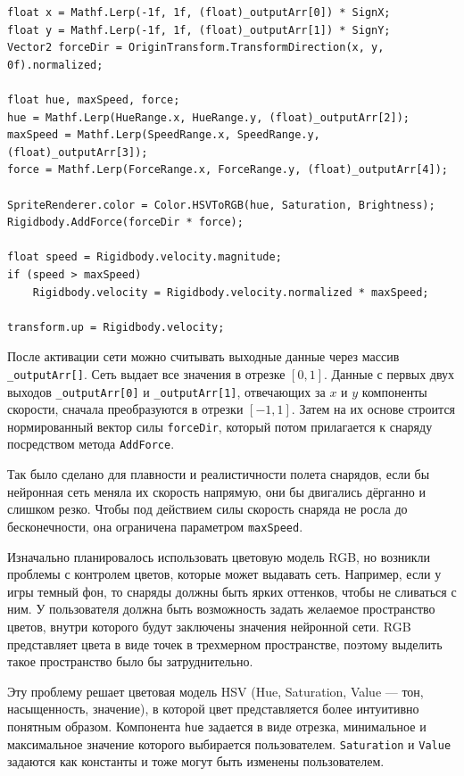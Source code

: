 \pagebreak

\begin{lstlisting}[name=Projectile, caption={Projectile. Part 2}]
float x = Mathf.Lerp(-1f, 1f, (float)_outputArr[0]) * SignX;
float y = Mathf.Lerp(-1f, 1f, (float)_outputArr[1]) * SignY;    
Vector2 forceDir = OriginTransform.TransformDirection(x, y, 0f).normalized;
    
float hue, maxSpeed, force;
hue = Mathf.Lerp(HueRange.x, HueRange.y, (float)_outputArr[2]);
maxSpeed = Mathf.Lerp(SpeedRange.x, SpeedRange.y, (float)_outputArr[3]);
force = Mathf.Lerp(ForceRange.x, ForceRange.y, (float)_outputArr[4]);

SpriteRenderer.color = Color.HSVToRGB(hue, Saturation, Brightness);
Rigidbody.AddForce(forceDir * force);

float speed = Rigidbody.velocity.magnitude;
if (speed > maxSpeed)
    Rigidbody.velocity = Rigidbody.velocity.normalized * maxSpeed;

transform.up = Rigidbody.velocity;
\end{lstlisting}

После активации сети можно считывать выходные данные через массив \lstinline{_outputArr[]}. Сеть выдает все значения в отрезке $[0,1]$. Данные с первых двух выходов \lstinline{_outputArr[0]} и \lstinline{_outputArr[1]}, отвечающих за $x$ и $y$ компоненты скорости, сначала преобразуются в отрезки $[-1,1]$. Затем на их основе строится нормированный вектор силы \lstinline{forceDir}, который потом прилагается к снаряду посредством метода \lstinline{AddForce}.

Так было сделано для плавности и реалистичности полета снарядов, если бы нейронная сеть меняла их скорость напрямую, они бы двигались дёрганно и слишком резко. Чтобы под действием силы скорость снаряда не росла до бесконечности, она ограничена параметром \lstinline{maxSpeed}.

Изначально планировалось использовать цветовую модель RGB, но возникли проблемы с контролем цветов, которые может выдавать сеть. Например, если у игры темный фон, то снаряды должны быть ярких оттенков, чтобы не сливаться с ним. У пользователя должна быть возможность задать желаемое пространство цветов, внутри которого будут заключены значения нейронной сети. RGB представляет цвета в виде точек в трехмерном пространстве, поэтому выделить такое пространство было бы затруднительно.

Эту проблему решает цветовая модель HSV (Hue, Saturation, Value — тон, насыщенность, значение), в которой цвет представляется более интуитивно понятным образом. Компонента \lstinline{hue} задается в виде отрезка, минимальное и максимальное значение которого выбирается пользователем. \lstinline{Saturation} и \lstinline{Value} задаются как константы и тоже могут быть изменены пользователем.



